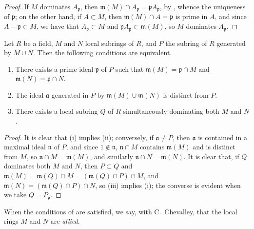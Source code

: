 \begin{proof}
If $M$ dominates $A_\mathfrak{p}$, then $\mathfrak{m}(M)\cap A_\mathfrak{p}=\mathfrak{p}A_\mathfrak{p}$, by , whence the uniqueness of $\mathfrak{p}$;
on the other hand, if $A\subset M$, then $\mathfrak{m}(M)\cap A=\mathfrak{p}$ is prime in $A$, and since $A-\mathfrak{p}\subset M$, we have that $A_\mathfrak{p}\subset M$ and $\mathfrak{p}A_\mathfrak{p}\subset\mathfrak{m}(M)$, so $M$ dominates $A_\mathfrak{p}$.
\end{proof}

\begin{lemma}[8.1.4]
\label{I.8.1.4}
Let $R$ be a field, $M$ and $N$ local subrings of $R$, and $P$ the subring of $R$ generated by $M\cup N$.
Then the following conditions are equivalent.
\begin{enumerate}
  \item[{\rm(i)}] There exists a prime ideal $\mathfrak{p}$ of $P$ such that $\mathfrak{m}(M)=\mathfrak{p}\cap M$ and $\mathfrak{m}(N)=\mathfrak{p}\cap N$.
  \item[{\rm(ii)}] The ideal $\mathfrak{a}$ generated in $P$ by $\mathfrak{m}(M)\cup\mathfrak{m}(N)$ is distinct from $P$.
  \item[{\rm(iii)}] There exists a local subring $Q$ of $R$ simultaneously dominating both $M$ and $N$.
\end{enumerate}
\end{lemma}

\begin{proof}
It is clear that (i) implies (ii);
conversely, if $\mathfrak{a}\neq P$, then $\mathfrak{a}$ is contained in a maximal ideal $\mathfrak{n}$ of $P$, and since $1\not\in\mathfrak{n}$, $\mathfrak{n}\cap M$ contains $\mathfrak{m}(M)$ and is distinct from $M$, so $\mathfrak{n}\cap M=\mathfrak{m}(M)$, and similarly $\mathfrak{n}\cap N=\mathfrak{m}(N)$.
It is clear that, if $Q$ dominates both $M$ and $N$, then $P\subset Q$ and $\mathfrak{m}(M)=\mathfrak{m}(Q)\cap M=(\mathfrak{m}(Q)\cap P)\cap M$, and $\mathfrak{m}(N)=(\mathfrak{m}(Q)\cap P)\cap N$, so (iii) implies (i);
the converse is evident when we take $Q=P_\mathfrak{p}$.
\end{proof}

When the conditions of  are satisfied, we say, with C.~Chevalley, that the local rings $M$ and $N$ are \emph{allied}.

